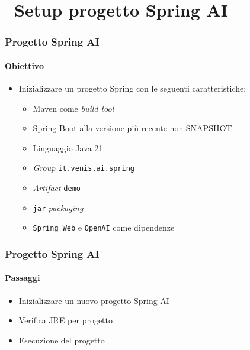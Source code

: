 \section{\faWrench\ Setup progetto Spring AI} %
\label{sec:spring-ai-project-setup}
%
\begin{frame}[t,fragile] \frametitle{Progetto Spring AI}
    \framesubtitle{Obiettivo}
    \begin{itemize}[leftmargin=10pt,align=right]
        \item[\alert{\faArrowCircleRight}] Inizializzare un progetto Spring con le seguenti caratteristiche:     
        \begin{itemize}[leftmargin=10pt,align=right]
            \item[\alert{\faArrowCircleRight}] \alert{Maven} come \textit{build tool}
            \item[\alert{\faArrowCircleRight}] Spring Boot alla versione più recente \alert{non SNAPSHOT}
            \item[\alert{\faArrowCircleRight}] Linguaggio \alert{Java 21}
            \item[\alert{\faArrowCircleRight}] \textit{Group} \alert{\texttt{it.venis.ai.spring}}
            \item[\alert{\faArrowCircleRight}] \textit{Artifact} \alert{\texttt{demo}}
            \item[\alert{\faArrowCircleRight}] \alert{\texttt{jar}} \textit{packaging}
            \item[\alert{\faArrowCircleRight}] \alert{\texttt{Spring Web}} e \alert{\texttt{OpenAI}} come dipendenze
        \end{itemize}
    \end{itemize}
\end{frame}
%
\begin{frame}[t,fragile] \frametitle{Progetto Spring AI}
    \framesubtitle{Passaggi}
	\begin{itemize}
        \item[\alertedcircled{1}] Inizializzare un nuovo progetto Spring AI
        \item[\alertedcircled{2}] Verifica JRE per progetto
        \item[\alertedcircled{3}] Esecuzione del progetto 
	\end{itemize}        
\end{frame}
%
